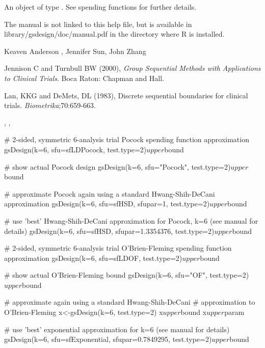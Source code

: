\begin{Value}
An object of type . See spending functions for further details.
\end{Value}
\begin{Note}\relax
The manual is not linked to this help file, but is available in library/gsdesign/doc/manual.pdf
in the directory where R is installed.
\end{Note}
\begin{Author}\relax
Keaven Anderson , Jennifer Sun, John Zhang
\end{Author}
\begin{References}\relax
Jennison C and Turnbull BW (2000), \emph{Group Sequential Methods with Applications to Clinical Trials}.
Boca Raton: Chapman and Hall.

Lan, KKG and DeMets, DL (1983), Discrete sequential boundaries for clinical trials.\bsl{} \emph{Biometrika};70:659-663.
\end{References}
\begin{SeeAlso}\relax
{}, , 
\end{SeeAlso}
\begin{Examples}
\begin{ExampleCode}
# 2-sided,  symmetric 6-analysis trial Pocock spending function approximation 
gsDesign(k=6, sfu=sfLDPocock, test.type=2)$upper$bound

# show actual Pocock design
gsDesign(k=6, sfu="Pocock", test.type=2)$upper$bound

# approximate Pocock again using a standard Hwang-Shih-DeCani approximation
gsDesign(k=6, sfu=sfHSD, sfupar=1, test.type=2)$upper$bound

# use 'best' Hwang-Shih-DeCani approximation for Pocock,  k=6 (see manual for details)
gsDesign(k=6, sfu=sfHSD, sfupar=1.3354376, test.type=2)$upper$bound

# 2-sided,  symmetric 6-analysis trial O'Brien-Fleming spending function approximation 
gsDesign(k=6, sfu=sfLDOF, test.type=2)$upper$bound

# show actual O'Brien-Fleming bound
gsDesign(k=6, sfu="OF", test.type=2)$upper$bound

# approximate again using a standard Hwang-Shih-DeCani 
# approximation to O'Brien-Fleming
x<-gsDesign(k=6, test.type=2)
x$upper$bound
x$upper$param

# use 'best' exponential approximation for k=6 (see manual for details)
gsDesign(k=6, sfu=sfExponential, sfupar=0.7849295, test.type=2)$upper$bound
\end{ExampleCode}
\end{Examples}

